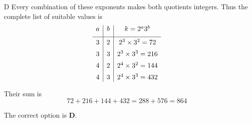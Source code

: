 \documentclass[11pt,a4paper]{article}
\begin{document}
\begin{enumerate}[label=\textbf{\arabic*.},leftmargin=*,itemsep=0pt,start=11]
\begin{djsSolution}{D}
Every combination of these exponents makes both quotients integers. Thus the complete list of suitable values is
\[
\begin{array}{c|c|c}
a&b&k=2^a3^b\\[5pt]
\hline
\rule{0pt}{2.5ex}3&2&2^3\times3^2=72\\[5pt]
3&3&2^3\times3^3=216\\[5pt]
4&2&2^4\times3^2=144\\[5pt]
4&3&2^4\times3^3=432
\end{array}
\]

Their sum is
\[
72+216+144+432=288+576=\boxed{864}
\]

The correct option is \textbf{D}.
\end{djsSolution}
\end{enumerate}
\clearpage
\thispagestyle{djssolutions}
\vspace*{8pt}
\end{document}
